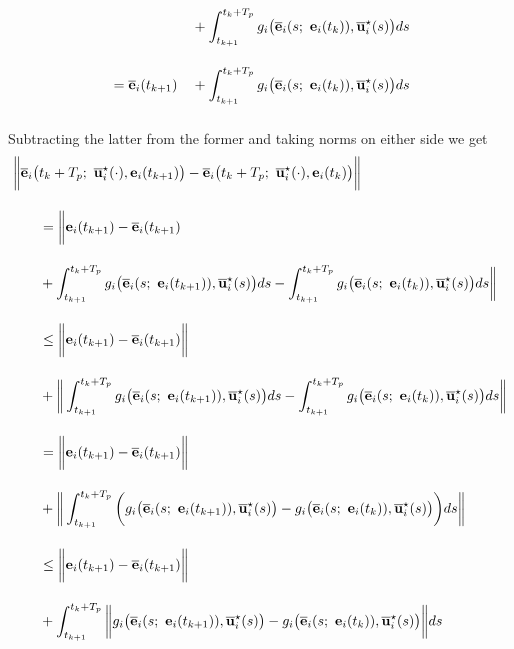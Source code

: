 \begin{gg_box}
\begin{alignat}{2}
    &                      &&+ \int_{t_{k+1}}^{t_k + T_p} g_i\big(\overline{\vect{e}}_i(s;\ \vect{e}_i(t_k)), \overline{\vect{u}}_i^{\star}(s) \big)ds \\[2.5ex]
    &= \overline{\vect{e}}_i(t_{k+1}) &&+ \int_{t_{k+1}}^{t_k + T_p} g_i\big(\overline{\vect{e}}_i(s;\ \vect{e}_i(t_k)), \overline{\vect{u}}_i^{\star}(s) \big)ds \\[2.5ex]
\end{alignat}
Subtracting the latter from the former and taking norms on either side we get
\begin{alignat}{2}
  \bigg \|\overline{\vect{e}}_i\big(&t_k + T_p;\ \overline{\vect{u}}_i^{\star}(\cdot), \vect{e}_i(t_{k+1})\big)
    - \overline{\vect{e}}_i\big(t_k + T_p;\ \overline{\vect{u}}_i^{\star}(\cdot), \vect{e}_i(t_k)\big) \bigg\| \\[2.5ex]
  &= \bigg \| \vect{e}_i(t_{k+1}) - \overline{\vect{e}}_i(t_{k+1}) \\[2.5ex]
  &+ \int_{t_{k+1}}^{t_k + T_p} g_i\big(\overline{\vect{e}}_i(s;\ \vect{e}_i(t_{k+1})), \overline{\vect{u}}_i^{\star}(s) \big)ds
    - \int_{t_{k+1}}^{t_k + T_p} g_i\big(\overline{\vect{e}}_i(s;\ \vect{e}_i(t_k)), \overline{\vect{u}}_i^{\star}(s) \big)ds \bigg \| \\[2.5ex]
  &\leq \bigg \| \vect{e}_i(t_{k+1}) - \overline{\vect{e}}_i(t_{k+1}) \bigg\| \\[2.5ex]
  &+ \bigg \| \int_{t_{k+1}}^{t_k + T_p} g_i\big(\overline{\vect{e}}_i(s;\ \vect{e}_i(t_{k+1})), \overline{\vect{u}}_i^{\star}(s) \big)ds
    - \int_{t_{k+1}}^{t_k + T_p} g_i\big(\overline{\vect{e}}_i(s;\ \vect{e}_i(t_k)), \overline{\vect{u}}_i^{\star}(s) \big)ds \bigg \| \\[2.5ex]
  &= \bigg \| \vect{e}_i(t_{k+1}) - \overline{\vect{e}}_i(t_{k+1}) \bigg\| \\[2.5ex]
  &+ \bigg \| \int_{t_{k+1}}^{t_k + T_p} \bigg( g_i\big(\overline{\vect{e}}_i(s;\ \vect{e}_i(t_{k+1})), \overline{\vect{u}}_i^{\star}(s) \big)
  -  g_i\big(\overline{\vect{e}}_i(s;\ \vect{e}_i(t_k)), \overline{\vect{u}}_i^{\star}(s) \big) \bigg) ds \bigg \| \\[2.5ex]
  &\leq \bigg \| \vect{e}_i(t_{k+1}) - \overline{\vect{e}}_i(t_{k+1}) \bigg\| \\[2.5ex]
  &+  \int_{t_{k+1}}^{t_k + T_p} \bigg\| g_i\big(\overline{\vect{e}}_i(s;\ \vect{e}_i(t_{k+1})), \overline{\vect{u}}_i^{\star}(s) \big)
  -  g_i\big(\overline{\vect{e}}_i(s;\ \vect{e}_i(t_k)), \overline{\vect{u}}_i^{\star}(s) \big) \bigg\| ds \\[2.5ex]

\end{alignat}
\end{gg_box}
